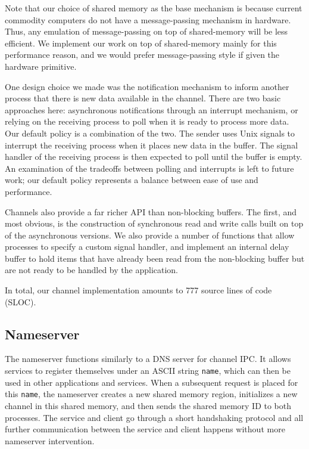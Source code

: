 \documentclass[letterpaper,twocolumn,11pt]{article}
\begin{document}
Note that our choice of shared memory as the base mechanism is because current commodity computers do not have a message-passing mechanism in hardware. Thus, any emulation of message-passing on top of shared-memory will be less efficient. We implement our work on top of shared-memory mainly for this performance reason, and we would prefer message-passing style if given the hardware primitive.

One design choice we made was the notification mechanism to inform another process that there is new data available in the channel. There are two basic approaches here: asynchronous notifications through an interrupt mechanism, or relying on the receiving process to poll when it is ready to process more data. Our default policy is a combination of the two. The sender uses Unix signals to interrupt the receiving process when it places new data in the buffer. The signal handler of the receiving process is then expected to poll until the buffer is empty. An examination of the tradeoffs between polling and interrupts is left to future work; our default policy represents a balance between ease of use and performance.

Channels also provide a far richer API than non-blocking buffers. The first, and most obvious, is the construction of synchronous read and write calls built on top of the asynchronous versions. We also provide a number of functions that allow processes to specify a custom signal handler, and implement an internal delay buffer to hold items that have already been read from the non-blocking buffer but are not ready to be handled by the application.

In total, our channel implementation amounts to 777 source lines of code (SLOC).

\subsection{Nameserver}
The nameserver functions similarly to a DNS server for channel IPC. It allows services to register themselves under an ASCII string {\tt name}, which can then be used in other applications and services. When a subsequent request is placed for this {\tt name}, the nameserver creates a new shared memory region, initializes a new channel in this shared memory, and then sends the shared memory ID to both processes. The service and client go through a short handshaking protocol and all further communication between the service and client happens without more nameserver intervention.
\end{document}
